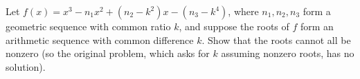 Let $f(x)=x^3-n_1x^2+\left(n_2-k^2\right)x-\left(n_3-k^4\right)$, where $n_1,n_2,n_3$ form a geometric sequence with common ratio $k$, and suppose the roots of $f$ form an arithmetic sequence with common difference $k$. Show that the roots cannot all be nonzero (so the original problem, which asks for $k$ assuming nonzero roots, has no solution).
